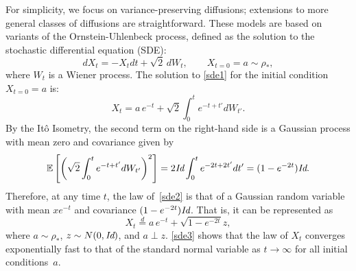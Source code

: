 For simplicity, we focus on variance-preserving diffusions; extensions to more general classes of diffusions are straightforward.
%
These models are based on variants of the Ornstein-Uhlenbeck process, defined as the solution to the stochastic differential equation (SDE):
\begin{equation}
	dX_t = -X_t dt +\sqrt{2}\,dW_t, \qquad X_{t=0} = a\sim \rho_*,
	\label{sde1}
\end{equation}
where $W_t$ is a Wiener process.
%
The solution to \eqref{sde1} for the initial condition $X_{t=0}=a$ is:
\begin{equation}
	X_t = a\,e^{-t}+\sqrt{2}\int_0^t  e^{-t+t'}dW_{t'}.
	\label{sde2}
\end{equation}
%
By the It\^o Isometry, the second term on the right-hand side is a Gaussian process with mean zero and covariance given by
%
\begin{equation}
	\mathbb{E}\left[\left(\sqrt{2}\int_0^te^{-t+t'}dW_{t'}\right)^2\right]= 2\text{\it Id} \int_0^te^{-2t+2t'}dt' = (1-e^{-2t})\text{\it Id}.
\end{equation}
%
Therefore, at any time $t$, the law of~\eqref{sde2} is that of a Gaussian random variable with mean $x e^{-t}$ and covariance $(1-e^{-2t})\text{\it Id}$.
%
That is, it can be represented as
\begin{equation}
	X_t \stackrel{d}{=} a\,e^{-t}+\sqrt{1-e^{-2t}} z,
	\label{sde3}
\end{equation}
%
where $a\sim \rho_*$, $z\sim  N(0,\text{\it Id})$, and $a\perp z$.
%
\eqref{sde3} shows that the law of $X_t$ converges exponentially fast to that of the standard normal variable as $t\to\infty$ for all initial conditions~$a$.


